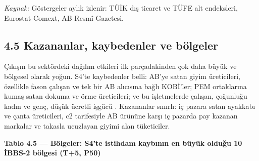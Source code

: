 \endgroup

\emph{Kaynak:} Göstergeler aylık izlenir: TÜİK dış ticaret ve TÜFE alt endeksleri, Eurostat Comext, AB Resmî Gazetesi.

\hypertarget{nace_kartlar_13-15-45-kazananlar-kaybedenler-ve-buxf6lgeler}{%
\subsection{4.5 Kazananlar, kaybedenler ve bölgeler}\label{nace_kartlar_13-15-45-kazananlar-kaybedenler-ve-buxf6lgeler}}

Çıkışın bu sektördeki dağılım etkileri ilk parçadakinden çok daha büyük ve bölgesel olarak yoğun. S4'te kaybedenler belli: AB'ye satan giyim üreticileri, özellikle fason çalışan ve tek bir AB alıcısına bağlı KOBİ'ler; PEM ortaklarına kumaş satan dokuma ve örme üreticileri; ve bu işletmelerde çalışan, çoğunluğu kadın ve genç, düşük ücretli işgücü \etiketH{}. Kazananlar sınırlı: iç pazara satan ayakkabı ve çanta üreticileri, c2 tarifesiyle AB ürününe karşı iç pazarda pay kazanan markalar ve takasla ucuzlayan giyimi alan tüketiciler.


\textbf{Tablo 4.5 --- Bölgeler: S4'te istihdam kaybının en büyük olduğu 10 İBBS-2 bölgesi (T+5, P50)}

\nopagebreak[4]

\begingroup\gbtablo\footnotesize

